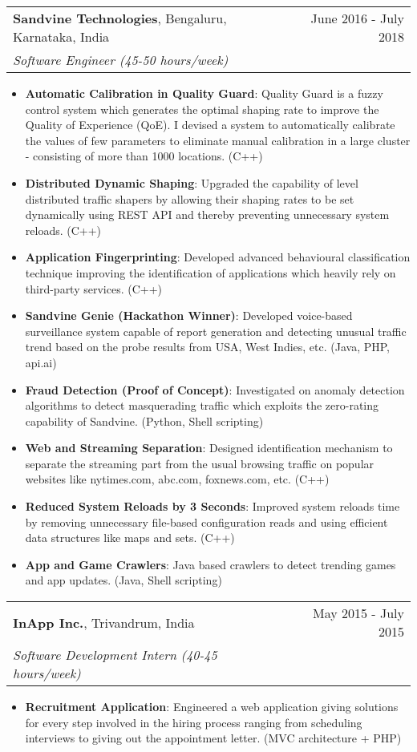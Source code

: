 \documentclass[letterpaper,11pt]{article}
\makeatletter
\newcommand{\resumeItem}[2]{
  \item\small{
    \textbf{#1}{: #2 \vspace{-2pt}}
  }
}
\newcommand{\resumeExpHeading}[4]{
    \vspace{-1pt}
    \begin{tabular*}{\textwidth}{l@{\extracolsep{\fill}}r}
      \textbf{#1}{, #2} & #4 \\
      \textit{\small#3} &  \\
    \end{tabular*}
}
\newcommand{\resumeSubItem}[2]{\resumeItem{#1}{#2}\vspace{-4pt}}
\newcommand{\resumeSubHeadingListStart}{\begin{itemize}[leftmargin=*]}
\newcommand{\resumeSubHeadingListEnd}{\end{itemize}}
\makeatother
\begin{document}
    \resumeExpHeading
      {Sandvine Technologies}{Bengaluru, Karnataka, India}
      {Software Engineer (45-50 hours/week)}{June 2016 - July 2018}
      \resumeSubHeadingListStart
        \resumeSubItem{Automatic Calibration in Quality Guard}
          {Quality Guard is a fuzzy control system which generates the optimal shaping rate to improve the Quality of Experience (QoE). I devised a system to automatically calibrate the values of few parameters to eliminate manual calibration in a large cluster - consisting of more than 1000 locations. (C++)}  
        \resumeSubItem{Distributed Dynamic Shaping}
          {Upgraded the capability of level distributed traffic shapers by allowing their shaping rates to be set dynamically using REST API and thereby preventing unnecessary system reloads. (C++)}  
        \resumeSubItem{Application Fingerprinting}
          {Developed advanced behavioural classification technique improving the identification of applications which heavily rely on third-party services. (C++)}
        \resumeSubItem{Sandvine Genie (Hackathon Winner)}
          {Developed voice-based surveillance system capable of report generation and detecting unusual traffic trend based on the probe results from USA, West Indies, etc. (Java, PHP, api.ai)}
        \resumeSubItem{Fraud Detection (Proof of Concept)}
          {Investigated on anomaly detection algorithms to detect masquerading traffic which exploits the zero-rating capability of Sandvine. (Python, Shell scripting)}
        \resumeSubItem{Web and Streaming Separation}
          {Designed identification mechanism to separate the streaming part from the usual browsing traffic on popular websites like nytimes.com, abc.com, foxnews.com, etc. (C++)}
        \resumeSubItem{Reduced System Reloads by 3 Seconds}
          {Improved system reloads time by removing unnecessary file-based configuration reads and using efficient data structures like maps and sets. (C++)}
        \iffalse  
        \resumeItem{Network Forensics using Machine Learning}
          {Project to detect Malware inside TCP packet based on their
          anomalous characteristics. The TCP header fields are used as datasets to implement the machine learning model.}
        \fi  
        \resumeSubItem{App and Game Crawlers}
          {Java based crawlers to detect trending games and app updates. (Java, Shell scripting)}
        
      \resumeSubHeadingListEnd
\vspace{7pt}
    \resumeExpHeading
      {InApp Inc.}{Trivandrum, India}
      {Software Development Intern (40-45 hours/week)}{May 2015 - July 2015}
      \resumeSubHeadingListStart
        \resumeSubItem{Recruitment Application}
          {Engineered a web application giving solutions for every step involved in the hiring process ranging from scheduling interviews to giving out the appointment letter. (MVC architecture + PHP)  }
      \resumeSubHeadingListEnd
  
\end{document}
